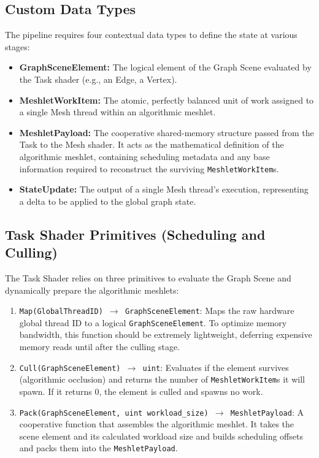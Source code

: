 \documentclass[11pt, a4paper]{article}
\begin{document}
\subsection{Custom Data Types}
The pipeline requires four contextual data types to define the state at various stages:
\begin{itemize}
    \item \textbf{GraphSceneElement:} The logical element of the Graph Scene evaluated by the Task shader (e.g., an Edge, a Vertex).
    \item \textbf{MeshletWorkItem:} The atomic, perfectly balanced unit of work assigned to a single Mesh thread within an algorithmic meshlet.
    \item \textbf{MeshletPayload:} The cooperative shared-memory structure passed from the Task to the Mesh shader. It acts as the mathematical definition of the algorithmic meshlet, containing scheduling metadata and any base information required to reconstruct the surviving \texttt{MeshletWorkItem}s.
    \item \textbf{StateUpdate:} The output of a single Mesh thread's execution, representing a delta to be applied to the global graph state.
\end{itemize}

\subsection{Task Shader Primitives (Scheduling and Culling)}
The Task Shader relies on three primitives to evaluate the Graph Scene and dynamically prepare the algorithmic meshlets:
\begin{enumerate}
    \item \texttt{Map(GlobalThreadID) $\rightarrow$ GraphSceneElement}: Maps the raw hardware global thread ID to a logical \texttt{GraphSceneElement}. To optimize memory bandwidth, this function should be extremely lightweight, deferring expensive memory reads until after the culling stage.
    \item \texttt{Cull(GraphSceneElement) $\rightarrow$ uint}: Evaluates if the element survives (algorithmic occlusion) and returns the number of \texttt{MeshletWorkItem}s it will spawn. If it returns 0, the element is culled and spawns no work.
    \item \texttt{Pack(GraphSceneElement, uint workload\_size) $\rightarrow$ MeshletPayload}: A cooperative function that assembles the algorithmic meshlet. It takes the scene element and its calculated workload size and builds scheduling offsets and packs them into the \texttt{MeshletPayload}.
\end{enumerate}
\end{document}

